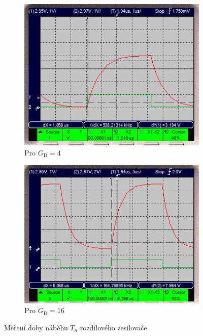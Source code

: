\documentclass[twoside]{article}
\begin{document}
\begin{figure}[h!]
    \centering
    \begin{subfigure}{0.45\textwidth}
        \centering
        \includegraphics[width=0.8\linewidth]{rise_time_4.png}
        \caption{Pro $G_\text{D}=4$}
        \label{fig:rise_time_4}
    \end{subfigure}
    \begin{subfigure}{0.45\textwidth}
        \centering
        \includegraphics[width=0.8\linewidth]{rise_time_16.png}
        \caption{Pro $G_\text{D}=16$}
        \label{fig:rise_time_16}
    \end{subfigure}
    \caption{Měření doby náběhu $T_n$ rozdílového zesilovače}
\end{figure}
\end{document}
